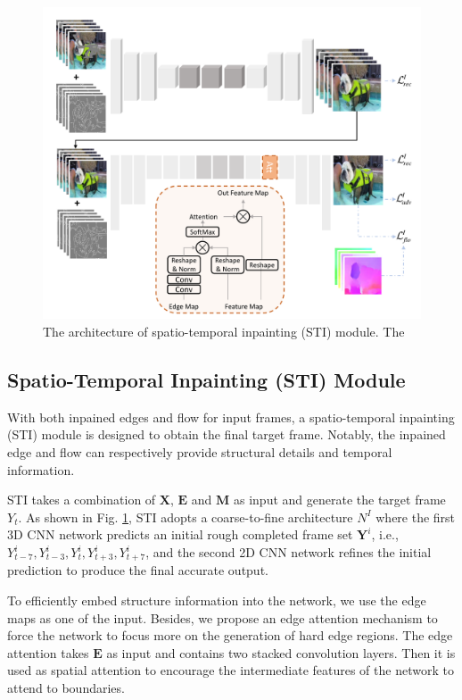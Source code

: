 \begin{figure}[t]
	\centering
	\includegraphics[width=0.95\columnwidth]{sti} %
	\caption{The architecture of spatio-temporal inpainting (STI) module. The }
	\label{sti}
\end{figure}
\subsection{Spatio-Temporal Inpainting (STI) Module}
With both inpained edges and flow for input frames, a spatio-temporal inpainting (STI) module is designed to obtain the final target frame.
Notably, the inpained edge and flow can respectively provide structural details and temporal information.

STI takes a combination of $\boldsymbol{X}$, $\boldsymbol{E}$ and $\boldsymbol{M}$ as input and generate the target frame $Y_t$.
As shown in Fig. \ref{sti}, STI adopts a coarse-to-fine architecture $N^I$ where the first 3D CNN network predicts an initial rough completed frame set $\boldsymbol{Y}^i$, i.e., \(Y^i_{t-7},Y^i_{t-3},Y^i_{t},Y^i_{t+3},Y^i_{t+7}\), and the second 2D CNN network refines the initial prediction to produce the final accurate output. 

To efficiently embed structure information into the network, we use the edge maps as one of the input. Besides, we propose an edge attention mechanism to force the network to focus more on the generation of hard edge regions.
The edge attention takes $\boldsymbol{E}$ as input and contains two stacked convolution layers. Then it is used as spatial attention to encourage the intermediate features of the network to attend to boundaries.


